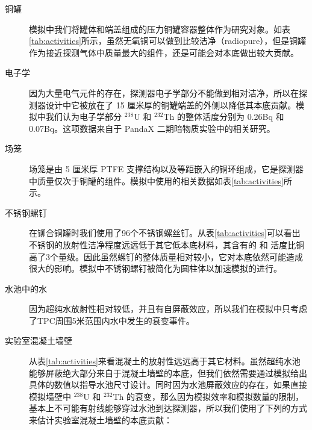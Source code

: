 \begin{description}

    \item[铜罐] 模拟中我们将罐体和端盖组成的压力铜罐容器整体作为研究对象。如表\ref{tab:activities}所示，虽然无氧铜可以做到比较洁净（radiopure），但是铜罐作为接近探测气体中质量最大的组件，还是可能会对本底做出较大贡献。

    \item[电子学] 因为大量电气元件的存在，探测器电子学部分不能做到相对洁净，所以在探测器设计中它被放在了 15 厘米厚的铜罐端盖的外侧以降低其本底贡献。模拟中我们认为电子学部分 $^{238}$U 和 $^{232}$Th 的整体活度分别为 0.26Bq 和 0.07Bq。这项数据来自于 PandaX 二期暗物质实验中的相关研究。
    
    \item[场笼] 场笼是由 5 厘米厚 PTFE 支撑结构以及等距嵌入的铜环组成，它是探测器中质量仅次于铜罐的组件。模拟中使用的相关数据如表\ref{tab:activities}所示。

    \item[不锈钢螺钉] 在铆合铜罐时我们使用了96个不锈钢螺丝钉。从表\ref{tab:activities}可以看出不锈钢的放射性洁净程度远远低于其它低本底材料，其含有的 \utte 和 \thttt 活度比铜高了3个量级。因此虽然螺钉的整体质量相对较小，它对本底依然可能造成很大的影响。模拟中不锈钢螺钉被简化为圆柱体以加速模拟的进行。

    \item[水池中的水] 因为超纯水放射性相对较低，并且有自屏蔽效应，所以我们在模拟中只考虑了TPC周围5米范围内水中发生的衰变事件。

    \item[实验室混凝土墙壁] 从表\ref{tab:activities}来看混凝土的放射性远远高于其它材料。虽然超纯水池能够屏蔽绝大部分来自于混凝土墙壁的本底，但我们依然需要通过模拟给出具体的数值以指导水池尺寸设计。同时因为水池屏蔽效应的存在，如果直接模拟墙壁中 $^{238}$U 和 $^{232}$Th 的衰变，那么因为模拟效率和模拟数量的限制，基本上不可能有射线能够穿过水池到达探测器，所以我们使用了下列的方式来估计实验室混凝土墙壁的本底贡献：


\end{description}
